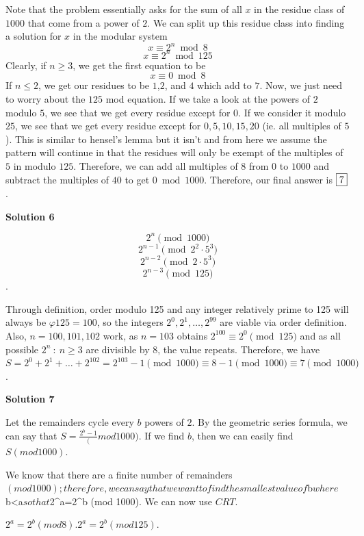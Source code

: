 \begin{enumerate}
Note that the problem essentially asks for the sum of all $x$ in the residue class of $1000$ that come from a power of $2$. We can split up this residue class into  finding a solution for $x$ in the modular system 
 \[x \equiv 2^n \bmod 8\] 
 \[x \equiv 2^n \bmod 125\] Clearly, if $n \geq 3$, we get the first equation to be 
 \[x \equiv 0 \bmod 8\] If $n \leq 2$, we get our residues to be $1$,$2$, and $4$ which add to $7$. Now, we just need to worry about the $125$ mod equation. If we take a look at the powers of $2$ modulo $5$, we see that we get every residue except for $0$. If we consider it modulo $25$, we see that we get every residue except for $0,5,10,15,20$ (ie. all multiples of $5$). This is similar to hensel's lemma but it isn't and from here we assume the pattern will continue in that the residues will only be exempt of the multiples of $5$ in modulo $125$. Therefore, we can add all multiples of $8$ from $0$ to $1000$ and subtract the multiples of $40$ to get $0 \bmod 1000$. Therefore, our final answer is $\fbox{7}$.

 



\textbf{Solution 6}


 \[2^n \pmod{1000}\]
 \[2^{n-1} \pmod{2^2 \cdot 5^3}\]
 \[2^{n-2} \pmod{2 \cdot 5^3}\]
 \[2^{n-3} \pmod{125}\].

 Through definition, order modulo 125 and any integer relatively prime to 125 will always be $\varphi{125} = 100$, so the integers $2^0, 2^1, \dots, 2^{99}$ are viable via order definition. Also, $n = 100, 101, 102$ work, as $n=103$ obtains $2^{100} \equiv 2^0 \pmod{125}$ and as all possible $2^n \ : \ n \ge 3$ are divisible by 8, the value repeats. Therefore, we have $S = 2^0 + 2^1 + \dots + 2^{102} = 2^{103} - 1 \pmod{1000} \equiv 8-1 \pmod{1000} \equiv \boxed{7} \pmod{1000}$.

 



\textbf{Solution 7}

Let the remainders cycle every $b$ powers of $2$. By the geometric series formula, we can say that $S=\frac{2^b -1} (mod 1000)$. If we find $b$, then we can easily find $S (mod 1000)$.

 We know that there are a finite number of remainders $(mod 1000); therefore, we can say that we want to find the smallest value of$b$where$b<a$so that$2\textasciicircum{}a=2\textasciicircum{}b (mod 1000). We can now use $CRT$.

 $2^a=2^b (mod 8)$.$2^a=2^b (mod 125)$.


\end{enumerate}
